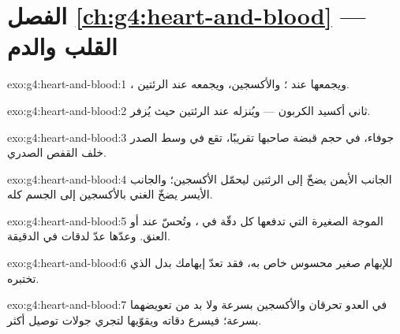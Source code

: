 \section*{الفصل \ref{ch:g4:heart-and-blood} --- القلب والدم}

\begin{solution}{exo:g4:heart-and-blood:1}
، ويجمعها عند ؛ والأكسجين، ويجمعه عند
الرئتين.
\end{solution}

\begin{solution}{exo:g4:heart-and-blood:2}
ثاني أكسيد الكربون --- ويُنزله عند الرئتين حيث يُزفر.
\end{solution}

\begin{solution}{exo:g4:heart-and-blood:3}
 جوفاء، في حجم قبضة صاحبها تقريبًا، تقع في وسط الصدر خلف القفص
الصدري.
\end{solution}

\begin{solution}{exo:g4:heart-and-blood:4}
الجانب الأيمن يضخّ  إلى الرئتين ليحمّل الأكسجين؛ والجانب الأيسر
يضخّ  الغني بالأكسجين إلى الجسم كله.
\end{solution}

\begin{solution}{exo:g4:heart-and-blood:5}
الموجة الصغيرة التي تدفعها كل دقّة  في ، وتُحسّ عند
 أو العنق. وعدّها عدّ لدقات  في الدقيقة.
\end{solution}

\begin{solution}{exo:g4:heart-and-blood:6}
للإبهام  صغير محسوس خاص به، فقد تعدّ إبهامك بدل  الذي
تختبره.
\end{solution}

\begin{solution}{exo:g4:heart-and-blood:7}
 في العدو تحرقان  والأكسجين بسرعة ولا بد من تعويضهما
بسرعة؛ فيسرع  دقاته ويقوّيها لتجري جولات توصيل  أكثر.
\end{solution}

